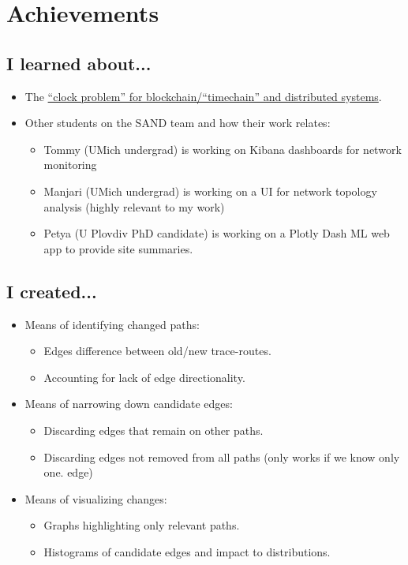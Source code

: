 \documentclass{weeklyreport}
\begin{document}
\section*{Achievements}
\subsection*{I learned about...}
\begin{itemize}
	\item The \href{https://multicoin.capital/2019/07/16/the-separation-of-time-and-state/}{“clock problem” for blockchain/“timechain” and distributed systems}.
	\item Other students on the SAND team and how their work relates:
	\begin{itemize}
		\item Tommy (UMich undergrad) is working on Kibana dashboards for network monitoring
		\item Manjari (UMich undergrad) is working on a UI for network topology analysis (highly relevant to my work)
		\item Petya (U Plovdiv PhD candidate) is working on a Plotly Dash ML web app to provide site summaries.
	\end{itemize}
\end{itemize}

\subsection*{I created...}
\begin{itemize}
	\item Means of identifying changed paths:
	\begin{itemize}
		\item Edges difference between old/new trace-routes.
		\item Accounting for lack of edge directionality.
	\end{itemize}
	\item Means of narrowing down candidate edges:
	\begin{itemize}
		\item Discarding edges that remain on other paths.
		\item Discarding edges not removed from all paths (only works if we know only one. edge)	
	\end{itemize}
	\item Means of visualizing changes:
	\begin{itemize}
		\item Graphs highlighting only relevant paths.
		\item Histograms of candidate edges and impact to distributions.	
	\end{itemize}
\end{itemize}
\end{document}
